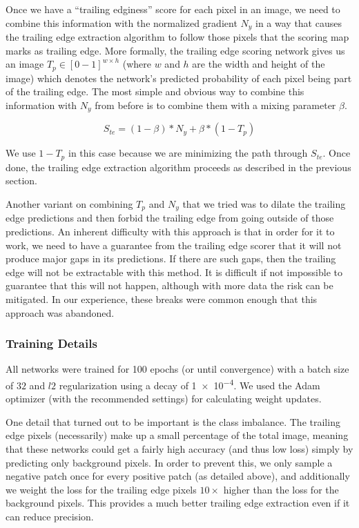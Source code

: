 Once we have a ``trailing edginess'' score for each pixel in an image, we need to combine this information with the normalized gradient $N_y$ in a way that causes the trailing edge extraction algorithm to follow those pixels that the scoring map marks as trailing edge.
More formally, the trailing edge scoring network gives us an image $T_p \in [0-1]^{w \times h}$ (where $w$ and $h$ are the width and height of the image) which denotes the network's predicted probability of each pixel being part of the trailing edge.
The most simple and obvious way to combine this information with $N_y$ from before is to combine them with a mixing parameter $\beta$.

\begin{equation}
S_{te} = (1 - \beta)*N_y + \beta*(1 - T_p)
\end{equation}

We use $1 - T_p$ in this case because we are minimizing the path through $S_{te}$.
Once done, the trailing edge extraction algorithm proceeds as described in the previous section.

Another variant on combining $T_p$ and $N_y$ that we tried was to dilate the trailing edge predictions and then forbid the trailing edge from going outside of those predictions.
An inherent difficulty with this approach is that in order for it to work, we need to have a guarantee from the trailing edge scorer that it will not produce major gaps in its predictions.
If there are such gaps, then the trailing edge will not be extractable with this method.
It is difficult if not impossible to guarantee that this will not happen, although with more data the risk can be mitigated.
In our experience, these breaks were common enough that this approach was abandoned.

\subsubsection{Training Details}

All networks were trained for 100 epochs (or until convergence) with a batch size of $32$ and $l2$ regularization using a decay of \num{1e-4}.
We used the Adam optimizer \cite{kingma2014adam} (with the recommended settings) for calculating weight updates.

One detail that turned out to be important is the class imbalance.
The trailing edge pixels (necessarily) make up a small percentage of the total image, meaning that these networks could get a fairly high accuracy (and thus low loss) simply by predicting only background pixels.
In order to prevent this, we only sample a negative patch once for every positive patch (as detailed above), and additionally we weight the loss for the trailing edge pixels $10\times$ higher than the loss for the background pixels.
This provides a much better trailing edge extraction even if it can reduce precision.

